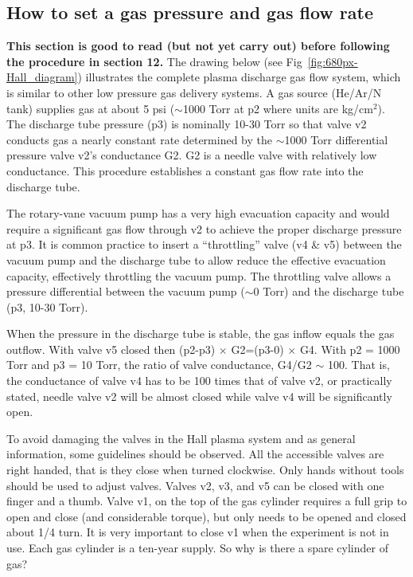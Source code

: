 \documentclass{../lab}
\begin{document}
\subsection{How to set a gas pressure and gas flow rate}

\textbf{This section is good to read (but not yet carry out) before following the procedure in section 12.} The drawing below (see Fig~\ref{fig:680px-Hall_diagram}) illustrates the complete plasma discharge gas flow system, which is similar to other low pressure gas delivery systems. A gas source (He/Ar/N tank) supplies gas at about 5 psi ($\sim$1000 Torr  at p2 where units are kg/cm$^2$). The discharge tube pressure (p3) is nominally 10-30 Torr so that valve v2 conducts gas a nearly constant rate determined by the $\sim$1000 Torr differential pressure valve v2’s conductance G2. G2 is a needle valve with relatively low conductance. This procedure establishes a constant gas flow rate into the discharge tube.

The rotary-vane vacuum pump has a very high evacuation capacity and would require a significant gas flow through v2 to achieve the proper discharge pressure at p3. It is common practice to insert a ``throttling'' valve (v4 \& v5) between the vacuum pump and the discharge tube to allow reduce the effective evacuation capacity, effectively throttling the vacuum pump. The throttling valve allows a pressure differential between the vacuum pump ($\sim$0 Torr) and the discharge tube (p3, 10-30 Torr).

When the pressure in the discharge tube is stable, the gas inflow equals the gas outflow. With valve v5 closed then (p2-p3) $\times$ G2=(p3-0) $\times$ G4. With p2 = 1000 Torr and p3 = 10 Torr, the ratio of valve conductance, G4/G2 $\sim$ 100. That is, the conductance of valve v4 has to be 100 times that of valve v2, or practically stated, needle valve v2 will be almost closed while valve v4 will be significantly open.

To avoid damaging the valves in the Hall plasma system and as general information, some guidelines should be observed. All the accessible valves are right handed, that is they close when turned clockwise. Only hands without tools should be used to adjust valves. Valves v2, v3, and v5 can be closed with one finger and a thumb. Valve v1, on the top of the gas cylinder requires a full grip to open and close (and considerable torque), but only needs to be opened and closed about 1/4 turn. It is very important to close v1 when the experiment is not in use. Each gas cylinder is a ten-year supply. So why is there a spare cylinder of gas?
\end{document}
